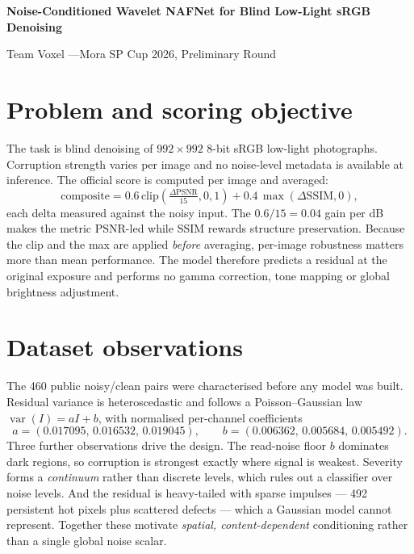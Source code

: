 \documentclass[12pt,a4paper]{article}
\begin{document}
\begin{center}
{\large\bfseries Noise-Conditioned Wavelet NAFNet for Blind Low-Light sRGB Denoising\par}
\vspace{0.3em}
{\normalsize Team Voxel \quad---\quad Mora SP Cup 2026, Preliminary Round}\par
\end{center}
\vspace{-0.3em}

\section{Problem and scoring objective}
The task is blind denoising of $992\times992$ 8-bit sRGB low-light photographs. Corruption strength varies per image and no noise-level metadata is available at inference. The official score is computed per image and averaged:
\begin{equation}
\mathrm{composite}=0.6\,\mathrm{clip}\!\left(\tfrac{\Delta\mathrm{PSNR}}{15},0,1\right)+0.4\,\max(\Delta\mathrm{SSIM},0),
\end{equation}
each delta measured against the noisy input. The $0.6/15=0.04$ gain per dB makes the metric PSNR-led while SSIM rewards structure preservation. Because the clip and the max are applied \emph{before} averaging, per-image robustness matters more than mean performance. The model therefore predicts a residual at the original exposure and performs no gamma correction, tone mapping or global brightness adjustment.

\section{Dataset observations}
The 460 public noisy/clean pairs were characterised before any model was built. Residual variance is heteroscedastic and follows a Poisson--Gaussian law $\operatorname{var}(I)=aI+b$, with normalised per-channel coefficients
\[
a=(0.017095,\,0.016532,\,0.019045),\qquad b=(0.006362,\,0.005684,\,0.005492).
\]
Three further observations drive the design. The read-noise floor $b$ dominates dark regions, so corruption is strongest exactly where signal is weakest. Severity forms a \emph{continuum} rather than discrete levels, which rules out a classifier over noise levels. And the residual is heavy-tailed with sparse impulses --- 492 persistent hot pixels plus scattered defects --- which a Gaussian model cannot represent. Together these motivate \emph{spatial, content-dependent} conditioning rather than a single global noise scalar.
\end{document}
